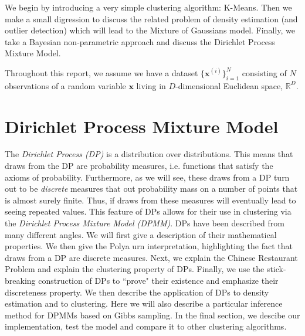 \documentclass[final,3p,times,twocolumn]{elsarticle}
\begin{document}
We begin by introducing a very simple clustering algorithm: K-Means. 
Then we make a small digression to discuss the related problem of density estimation (and outlier detection) which will lead to the Mixture of Gaussians model.
Finally, we take a Bayesian non-parametric approach and discuss the Dirichlet Process Mixture Model.

Throughout this report, we assume we have a dataset $\{\boldsymbol x^{(i)}\}_{i=1}^N$ consisting of $N$ observations of a random variable $\boldsymbol x$ living in $D$-dimensional Euclidean space, $\mathbb{R}^D$.
 

\section{Dirichlet Process Mixture Model}
The \emph{Dirichlet Process (DP)} is a distribution over distributions.
This means that draws from the DP are probability measures, i.e. functions that satisfy the axioms of probability.
Furthermore, as we will see, these draws from a DP turn out to be \emph{discrete} measures that out probability mass on a number of points that is almost surely finite.
Thus, if draws from these measures will eventually lead to seeing repeated values. 
This feature of DPs allows for their use in clustering via the \emph{Dirichlet Process Mixture Model (DPMM)}.
DPs have been described from many different angles.
We will first give a description of their mathematical properties.
We then give the Polya urn interpretation, highlighting the fact that draws from a DP are discrete measures.
Next, we explain the Chinese Restaurant Problem and explain the clustering property of DPs. 
Finally, we use the stick-breaking construction of DPs to ``prove" their existence and emphasize their discreteness property.
We then describe the application of DPs to density estimation and to clustering. 
Here we will also describe a particular inference method for DPMMs based on Gibbs sampling.
In the final section, we descibe our implementation, test the model and compare it to other clustering algorithms.
\end{document}
